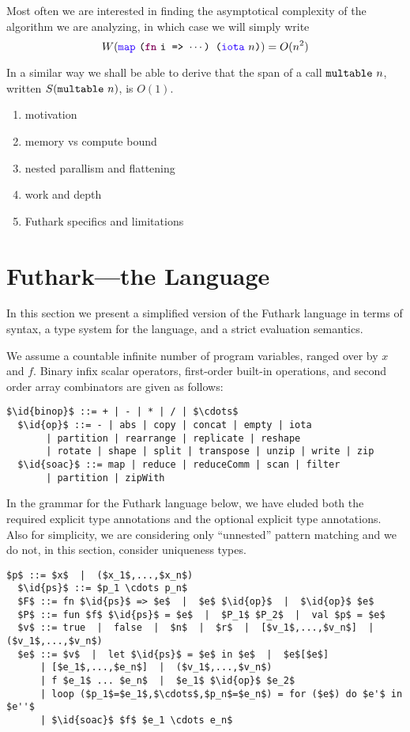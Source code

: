 \documentclass[oneside,11pt]{book}
\begin{document}
\noindent
Most often we are interested in finding the asymptotical complexity of
the algorithm we are analyzing, in which case we will simply write
$$W(\fop{map}~\kw{(}\fw{fn}~\kw{i => $\cdots$) (}\fop{iota}~\kw{$n$)}) = O(n^2) $$

In a similar way we shall be able to derive that the span of a call $\texttt{multable}~n$, written $S(\texttt{multable}~n)$, is $O(1)$.

\begin{enumerate}
\item motivation
\item memory vs compute bound
\item nested parallism and flattening
\item work and depth
\item Futhark specifics and limitations
\end{enumerate}

\section{Futhark---the Language}

In this section we present a simplified version of the Futhark
language in terms of syntax, a type system for the language, and a
strict evaluation semantics.

We assume a countable infinite number of program variables, ranged over
by $x$ and $f$. Binary infix scalar operators, first-order built-in operations, and
second order array combinators are given as follows:

\begin{lstlisting}[mathescape=true]
  $\id{binop}$ ::= + | - | * | / | $\cdots$
  $\id{op}$ ::= - | abs | copy | concat | empty | iota
       | partition | rearrange | replicate | reshape
       | rotate | shape | split | transpose | unzip | write | zip
  $\id{soac}$ ::= map | reduce | reduceComm | scan | filter
       | partition | zipWith
\end{lstlisting}

In the grammar for the Futhark language below, we have eluded both the
required explicit type annotations and the optional explicit type
annotations. Also for simplicity, we are considering only ``unnested''
pattern matching and we do not, in this section, consider uniqueness types.

\begin{lstlisting}[mathescape=true]
  $p$ ::= $x$  |  ($x_1$,...,$x_n$)
  $\id{ps}$ ::= $p_1 \cdots p_n$
  $F$ ::= fn $\id{ps}$ => $e$  |  $e$ $\id{op}$  |  $\id{op}$ $e$
  $P$ ::= fun $f$ $\id{ps}$ = $e$  |  $P_1$ $P_2$  |  val $p$ = $e$
  $v$ ::= true  |  false  |  $n$  |  $r$  |  [$v_1$,...,$v_n$]  |  ($v_1$,...,$v_n$)
  $e$ ::= $v$  |  let $\id{ps}$ = $e$ in $e$  |  $e$[$e$]
      | [$e_1$,...,$e_n$]  |  ($v_1$,...,$v_n$)
      | f $e_1$ ... $e_n$  |  $e_1$ $\id{op}$ $e_2$
      | loop ($p_1$=$e_1$,$\cdots$,$p_n$=$e_n$) = for ($e$) do $e'$ in $e''$
      | $\id{soac}$ $f$ $e_1 \cdots e_n$
\end{lstlisting}
\end{document}
